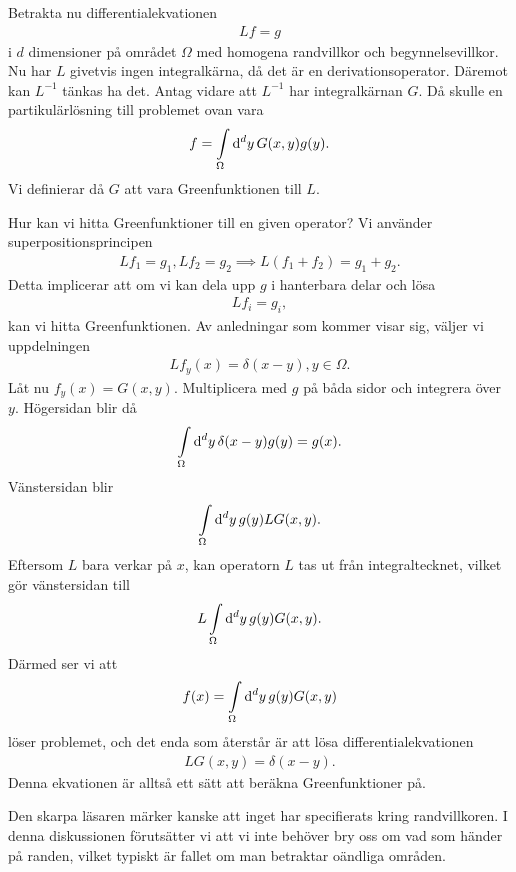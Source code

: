 Betrakta nu differentialekvationen
\begin{align*}
	Lf = g
\end{align*}
i $d$ dimensioner på området $\Omega$ med homogena randvillkor och begynnelsevillkor. Nu har $L$ givetvis ingen integralkärna, då det är en derivationsoperator. Däremot kan $L^{-1}$ tänkas ha det. Antag vidare att $L^{-1}$ har integralkärnan $G$. Då skulle en partikulärlösning till problemet ovan vara
\begin{align*}
	f = \int\limits_{\Omega}\dd[d]{y}G(x, y)g(y).
\end{align*}
Vi definierar då $G$ att vara Greenfunktionen till $L$.

Hur kan vi hitta Greenfunktioner till en given operator? Vi använder superpositionsprincipen
\begin{align*}
	Lf_{1} = g_{1}, Lf_{2} = g_{2} \implies L(f_{1} + f_{2}) = g_{1} + g_{2}.
\end{align*}
Detta implicerar att om vi kan dela upp $g$ i hanterbara delar och lösa
\begin{align*}
	Lf_{i} = g_{i},
\end{align*}
kan vi hitta Greenfunktionen. Av anledningar som kommer visar sig, väljer vi uppdelningen
\begin{align*}
	Lf_{y}(x) = \delta(x - y), y\in\Omega.
\end{align*}
Låt nu $f_{y}(x) = G(x, y)$. Multiplicera med $g$ på båda sidor och integrera över $y$. Högersidan blir då
\begin{align*}
	\int\limits_{\Omega}\dd[d]{y}\delta(x - y)g(y) = g(x).
\end{align*}
Vänstersidan blir
\begin{align*}
	\int\limits_{\Omega}\dd[d]{y}g(y)LG(x, y).
\end{align*}
Eftersom $L$ bara verkar på $x$, kan operatorn $L$ tas ut från integraltecknet, vilket gör vänstersidan till
\begin{align*}
	L\int\limits_{\Omega}\dd[d]{y}g(y)G(x, y).
\end{align*}
Därmed ser vi att
\begin{align*}
	f(x) = \int\limits_{\Omega}\dd[d]{y}g(y)G(x, y)
\end{align*}
löser problemet, och det enda som återstår är att lösa differentialekvationen
\begin{align*}
	LG(x, y) = \delta(x - y).
\end{align*}
Denna ekvationen är alltså ett sätt att beräkna Greenfunktioner på.

Den skarpa läsaren märker kanske att inget har specifierats kring randvillkoren. I denna diskussionen förutsätter vi att vi inte behöver bry oss om vad som händer på randen, vilket typiskt är fallet om man betraktar oändliga områden.

